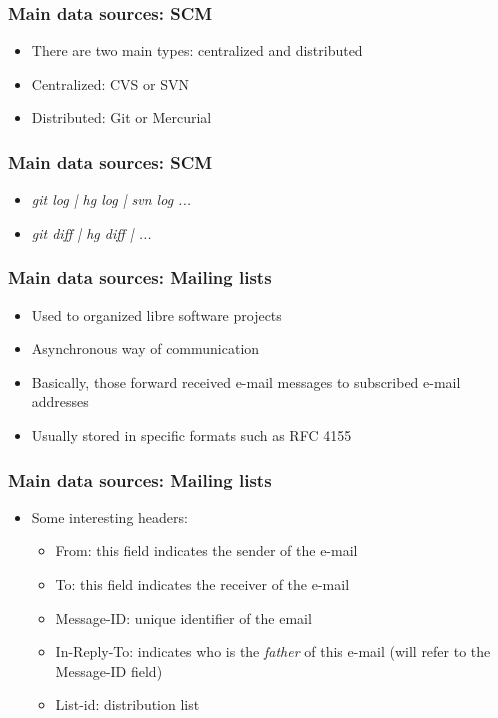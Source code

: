 \documentclass{beamer}
\begin{document}
\begin{frame}
 \frametitle{Main data sources: SCM}
 \begin{itemize}
 \item There are two main types: centralized and distributed
 \item Centralized: CVS or SVN
 \item Distributed: Git or Mercurial
 \end{itemize}
\end{frame}



\begin{frame}
 \frametitle{Main data sources: SCM}
 \begin{itemize}
 \item \emph{git log | hg log | svn log ...}
 \item \emph{git diff | hg diff | ...}
 \end{itemize}
\end{frame}



\begin{frame}
 \frametitle{Main data sources: Mailing lists}
 \begin{itemize}
 \item Used to organized libre software projects
 \item Asynchronous way of communication
 \item Basically, those forward received e-mail messages to subscribed e-mail addresses
 \item Usually stored in specific formats such as RFC 4155

 \end{itemize}

\end{frame}


\begin{frame}
 \frametitle{Main data sources: Mailing lists}
 \begin{itemize}
 \item Some interesting headers:
  \begin{itemize}
   \item From: this field indicates the sender of the e-mail
   \item To: this field indicates the receiver of the e-mail
   \item Message-ID: unique identifier of the email
   \item In-Reply-To: indicates who is the \emph{father} of this e-mail (will refer to the Message-ID field)
   \item List-id: distribution list
  \end{itemize}

 \end{itemize}


\end{frame}
\end{document}
